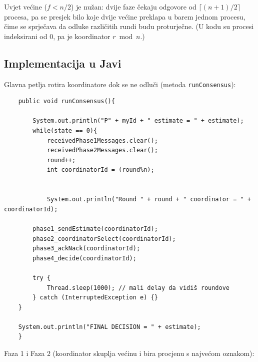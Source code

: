 \documentclass[11pt,a4paper]{article}
\begin{document}
Uvjet većine ($f < n/2$) je nužan: dvije faze čekaju odgovore od $\lceil
(n{+}1)/2 \rceil$ procesa, pa se presjek bilo koje dvije većine preklapa u barem
jednom procesu, čime se sprječava da odluke različitih rundi budu proturječne.
(U kodu su procesi indeksirani od 0, pa je koordinator $r \bmod n$.)

\subsection{Implementacija u Javi}

Glavna petlja rotira koordinatore dok se ne odluči (metoda \texttt{runConsensus}):

\begin{lstlisting}
    public void runConsensus(){

        System.out.println("P" + myId + " estimate = " + estimate);
        while(state == 0){
            receivedPhase1Messages.clear();
            receivedPhase2Messages.clear();
            round++;
            int coordinatorId = (round%n);


            System.out.println("Round " + round + " coordinator = " + coordinatorId);

        phase1_sendEstimate(coordinatorId);
        phase2_coordinatorSelect(coordinatorId);
        phase3_ackNack(coordinatorId);
        phase4_decide(coordinatorId);

        try {
            Thread.sleep(1000); // mali delay da vidiš roundove
        } catch (InterruptedException e) {}
    }

    System.out.println("FINAL DECISION = " + estimate);
    }
\end{lstlisting}

Faza 1 i Faza 2 (koordinator skuplja većinu i bira procjenu s najvećom oznakom):
\end{document}
